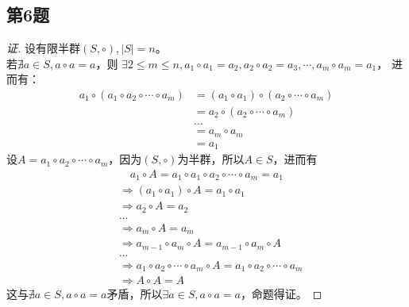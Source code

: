 \documentclass[11pt]{article}
\begin{document}
\subsection{第6题}
\begin{proof}[证]
  设有限半群$(S, \circ),|S| = n$。\\
  若$\nexists a \in S, a \circ a = a$，则
  $\exists 2 \le m \le n, a_1 \circ a_1 = a_2, a_2 \circ a_2 = a_3, \cdots , a_m \circ a_m = a_1$，
  进而有：
  \begin{align*}
    a_1 \circ (a_1 \circ a_2 \circ \cdots \circ a_m) &= (a_1 \circ a_1) \circ (a_2 \circ \cdots \circ a_m) \\
                                &= a_2 \circ (a_2 \circ \cdots \circ a_m) \\
                                & \ldots \\
                                &= a_m \circ a_m \\
                                &= a_1
  \end{align*}
  设$ A = a_1 \circ a_2\circ \cdots \circ a_m$，因为$(S, \circ)$为半群，所以$A \in S$，进而有
  \begin{align*}
    &\quad a_1 \circ A = a_1 \circ a_1 \circ a_2\circ \cdots \circ a_m = a_1 \\
    &\Rightarrow (a_1 \circ a_1) \circ A = a_1 \circ a_1 \\
    &\Rightarrow a_2 \circ A = a_2 \\
    &\ldots \\
    &\Rightarrow a_m \circ A = a_m \\
    &\Rightarrow a_{m - 1} \circ a_m \circ A = a_{m -1} \circ a_m \circ A \\
    &\ldots \\
    &\Rightarrow a_1 \circ a_2\circ \cdots \circ a_m \circ A = a_1 \circ a_2\circ \cdots \circ a_m \\
    &\Rightarrow A \circ A = A
  \end{align*}
  这与$\nexists a \in S, a \circ a = a$矛盾，所以$\exists a \in S, a \circ a = a$，命题得证。
\end{proof}
\end{document}
